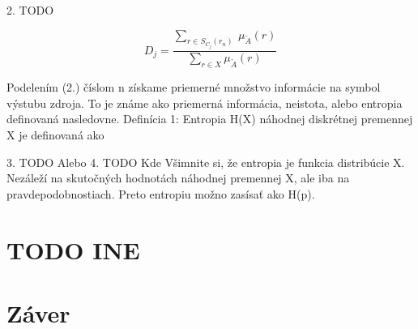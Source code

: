 2. TODO 

\begin{equation}\label{fuzzy}
D_j = \frac{ \sum\limits_{r \in S_{C_{j}}(r_n)  } \: \mu_{\tilde{A}} (r) }{\sum\limits_{r \in X  } \mu_{\tilde{A}} (r) }
\end{equation}




Podelením (2.) číslom n získame priemerné množstvo informácie na symbol výstubu zdroja. To je známe ako priemerná informácia, neistota, alebo entropia definovaná nasledovne.
Definícia 1:  Entropia H(X) náhodnej diskrétnej premennej X je definovaná ako 

3. TODO
Alebo
4.	TODO
Kde
Všimnite si, že entropia je funkcia distribúcie X. Nezáleží na skutočných hodnotách náhodnej premennej X, ale iba na pravdepodobnostiach. Preto entropiu možno zasísať ako H(p).


\section{TODO INE }

\section{Záver}